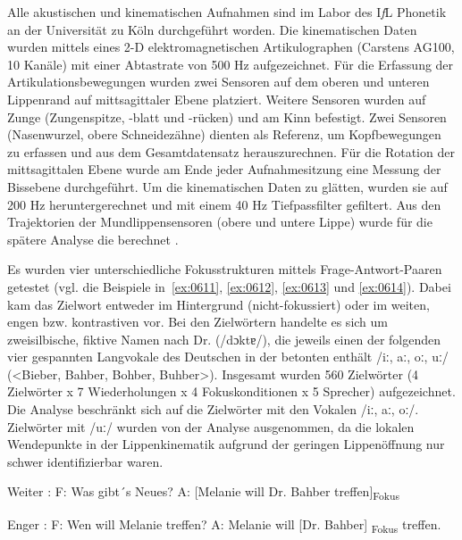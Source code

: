 Alle akustischen und kinematischen Aufnahmen sind im Labor des I\textit{f}L Phonetik an der Universität zu Köln durchgeführt worden. Die kinematischen Daten wurden mittels eines 2-D elektromagnetischen Artikulographen (Carstens AG100, 10 Kanäle) mit einer Abtastrate von 500 Hz aufgezeichnet. Für die Erfassung der Artikulationsbewegungen wurden zwei Sensoren auf dem oberen und unteren Lippenrand auf mittsagittaler Ebene platziert. Weitere Sensoren wurden auf Zunge (Zungenspitze, -blatt und -rücken) und am Kinn befestigt. Zwei Sensoren (Nasenwurzel, obere Schneidezähne) dienten als Referenz, um Kopfbewegungen zu erfassen und aus dem Gesamtdatensatz herauszurechnen. Für die Rotation der mittsagittalen Ebene wurde am Ende jeder Aufnahmesitzung eine Messung der Bissebene durchgeführt. Um die kinematischen Daten zu glätten, wurden sie auf 200 Hz heruntergerechnet und mit einem 40 Hz Tiefpassfilter gefiltert. Aus den Trajektorien der Mundlippensensoren (obere und untere Lippe) wurde für die spätere Analyse die  berechnet \citep[Lip-Aperture-Index,][]{Byrd2000a}.

Es wurden vier unterschiedliche Fokusstrukturen mittels Frage-Antwort-Paa\-ren getestet (vgl. die Beispiele in~\ref{ex:0611}, \ref{ex:0612}, \ref{ex:0613} und \ref{ex:0614}). Dabei kam das Zielwort entweder im Hintergrund (nicht-fokussiert) oder im weiten, engen bzw. kontrastiven  vor. Bei den Zielwörtern handelte es sich um zweisilbische, fiktive Namen nach Dr. (/dɔktɐ/), die jeweils einen der folgenden vier gespannten Langvokale des Deutschen in der betonten  enthält /iː, aː, oː, uː/ (<Bieber, Bahber, Bohber, Buhber>). Insgesamt wurden 560 Zielwörter (4 Zielwörter x 7 Wiederholungen x 4 Fokuskonditionen x 5 Sprecher) aufgezeichnet. Die Analyse beschränkt sich auf die Zielwörter mit den Vokalen /iː, aː, oː/. Zielwörter mit /uː/ wurden von der Analyse ausgenommen, da die lokalen Wendepunkte in der Lippenkinematik aufgrund der geringen Lippenöffnung nur schwer identifizierbar waren.

\begin{exe}
	\ex Weiter :\label{ex:0611}
	\sn F: Was gibt´s Neues?
	\sn A: [Melanie will Dr. Bahber treffen]\textsubscript{Fokus}
\end{exe}

\begin{exe}
	\ex Enger :\label{ex:0612}
	\sn F: Wen will Melanie treffen?
	\sn A: Melanie will [Dr. Bahber]\textsubscript{ Fokus} treffen.
\end{exe}

